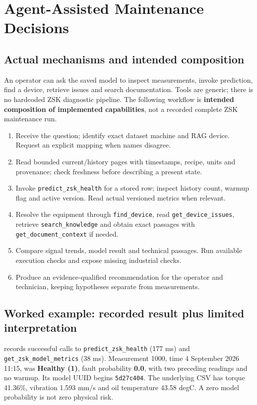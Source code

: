 \chapter{Agent-Assisted Maintenance Decisions}
\section{Actual mechanisms and intended composition}
An operator can ask the saved model to inspect measurements, invoke prediction, find a device, retrieve issues and search documentation. Tools are generic; there is no hardcoded ZSK diagnostic pipeline. The following workflow is \textbf{intended composition of implemented capabilities}, not a recorded complete ZSK maintenance run.
\begin{enumerate}
\item Receive the question; identify exact dataset machine and RAG device. Request an explicit mapping when names disagree.
\item Read bounded current/history pages with timestamps, recipe, units and provenance; check freshness before describing a present state.
\item Invoke \texttt{predict\_zsk\_health} for a stored row; inspect history count, warmup flag and active version. Read actual versioned metrics when relevant.
\item Resolve the equipment through \texttt{find\_device}, read \texttt{get\_device\_issues}, retrieve \texttt{search\_knowledge} and obtain exact passages with \texttt{get\_document\_context} if needed.
\item Compare signal trends, model result and technical passages. Run available execution checks and expose missing industrial checks.
\item Produce an evidence-qualified recommendation for the operator and technician, keeping hypotheses separate from measurements.
\end{enumerate}
\section{Worked example: recorded result plus limited interpretation}
 records successful calls to \texttt{predict\_zsk\_health} (177 ms) and \texttt{get\_zsk\_model\_metrics} (38 ms). Measurement 1000, time 4 September 2026 11:15, was \textbf{Healthy (1)}, fault probability \textbf{0.0}, with two preceding readings and no warmup. Its model UUID begins \texttt{5d27c404}. The underlying CSV has torque 41.36\%, vibration 1.593 mm/s and oil temperature 43.58 degC. A zero model probability is not zero physical risk.

